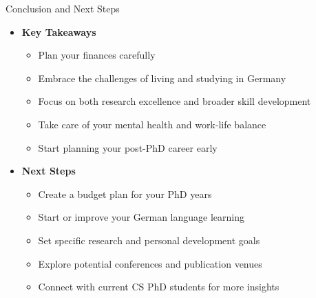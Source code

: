 \documentclass[aspectratio=169,10pt]{beamer}
\begin{document}
\begin{frame}{Conclusion and Next Steps}
\begin{itemize}
    \item \textbf{Key Takeaways}
    \begin{itemize}
        \item Plan your finances carefully
        \item Embrace the challenges of living and studying in Germany
        \item Focus on both research excellence and broader skill development
        \item Take care of your mental health and work-life balance
        \item Start planning your post-PhD career early
    \end{itemize}
    \item \textbf{Next Steps}
    \begin{itemize}
        \item Create a budget plan for your PhD years
        \item Start or improve your German language learning
        \item Set specific research and personal development goals
        \item Explore potential conferences and publication venues
        \item Connect with current CS PhD students for more insights
    \end{itemize}
\end{itemize}

\vspace{0.5cm}
\centering
{}
\end{frame}
\end{document}
